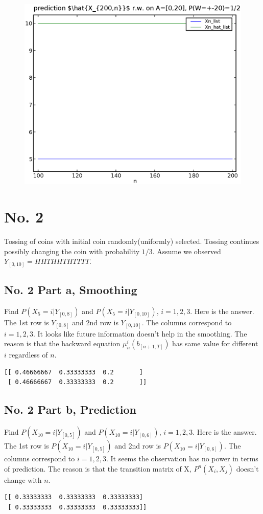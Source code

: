 \documentclass[a4paper,10pt]{article}
\begin{document}
\begin{figure}
\includegraphics[width=1\textwidth]{hw6_1_b_K_20_L_20_T_200.eps}
\caption{}\label{f8}
\end{figure}

\section{No. 2}
Tossing of coins with initial coin randomly(uniformly) selected. Tossing continues possibly changing the coin with probability $1/3$. Assume we observed $Y_{[0,10]} = HHTHHTHTTTT$.

\subsection{No. 2 Part a, Smoothing}
Find $P(X_5 = i | Y_{[0,8]})$ and $P(X_5 = i | Y_{[0,10]})$, $i=1,2,3$. Here is the answer. The 1st row is $Y_{[0,8]}$ and 2nd row is $Y_{[0,10]}$. The columns correspond to $i=1,2,3$. It looks like future information doesn't help in the smoothing. The reason is that the backward equation $\mu^i_n(b_{[n+1,T]})$ has same value for different $i$ regardless of $n$.

\begin{verbatim}
[[ 0.46666667  0.33333333  0.2       ]
 [ 0.46666667  0.33333333  0.2       ]]
\end{verbatim}


\subsection{No. 2 Part b, Prediction}
Find $P(X_{10} = i | Y_{[0,5]})$ and $P(X_{10} = i | Y_{[0,6]})$, $i=1,2,3$. Here is the answer. The 1st row is $P(X_{10} = i | Y_{[0,5]})$ and 2nd row is $P(X_{10} = i | Y_{[0,6]})$. The columns correspond to $i=1,2,3$. It seems the observation has no power in terms of prediction. The reason is that the transition matrix of X, $P^n(X_i,X_j)$ doesn't change with $n$.

\begin{verbatim}
[[ 0.33333333  0.33333333  0.33333333]
 [ 0.33333333  0.33333333  0.33333333]]
\end{verbatim}
\end{document}

